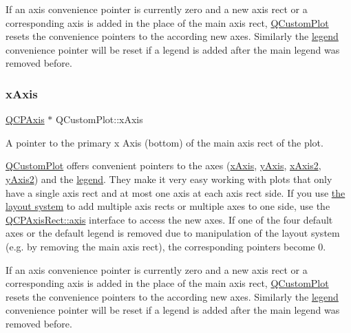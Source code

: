 If an axis convenience pointer is currently zero and a new axis rect or a corresponding axis is added in the place of the main axis rect, \hyperlink{class_q_custom_plot}{Q\+Custom\+Plot} resets the convenience pointers to the according new axes. Similarly the \hyperlink{class_q_custom_plot_a4eadcd237dc6a09938b68b16877fa6af}{legend} convenience pointer will be reset if a legend is added after the main legend was removed before. \mbox{\label{class_q_custom_plot_a9a79cd0158a4c7f30cbc702f0fd800e4}} 
\subsubsection{\texorpdfstring{x\+Axis}{xAxis}}
{\footnotesize\ttfamily \hyperlink{class_q_c_p_axis}{Q\+C\+P\+Axis} $\ast$ Q\+Custom\+Plot\+::x\+Axis}

A pointer to the primary x Axis (bottom) of the main axis rect of the plot.

\hyperlink{class_q_custom_plot}{Q\+Custom\+Plot} offers convenient pointers to the axes (\hyperlink{class_q_custom_plot_a9a79cd0158a4c7f30cbc702f0fd800e4}{x\+Axis}, \hyperlink{class_q_custom_plot_af6fea5679725b152c14facd920b19367}{y\+Axis}, \hyperlink{class_q_custom_plot_ada41599f22cad901c030f3dcbdd82fd9}{x\+Axis2}, \hyperlink{class_q_custom_plot_af13fdc5bce7d0fabd640f13ba805c0b7}{y\+Axis2}) and the \hyperlink{class_q_custom_plot_a4eadcd237dc6a09938b68b16877fa6af}{legend}. They make it very easy working with plots that only have a single axis rect and at most one axis at each axis rect side. If you use \hyperlink{}{the layout system} to add multiple axis rects or multiple axes to one side, use the \hyperlink{class_q_c_p_axis_rect_a583ae4f6d78b601b732183f6cabecbe1}{Q\+C\+P\+Axis\+Rect\+::axis} interface to access the new axes. If one of the four default axes or the default legend is removed due to manipulation of the layout system (e.\+g. by removing the main axis rect), the corresponding pointers become 0.

If an axis convenience pointer is currently zero and a new axis rect or a corresponding axis is added in the place of the main axis rect, \hyperlink{class_q_custom_plot}{Q\+Custom\+Plot} resets the convenience pointers to the according new axes. Similarly the \hyperlink{class_q_custom_plot_a4eadcd237dc6a09938b68b16877fa6af}{legend} convenience pointer will be reset if a legend is added after the main legend was removed before. \mbox{\label{class_q_custom_plot_ada41599f22cad901c030f3dcbdd82fd9}} 
